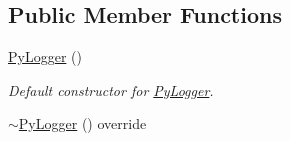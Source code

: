 \subsection*{Public Member Functions}
\begin{DoxyCompactItemize}
\item 
\hyperlink{class_py_logger_a83df7d583fb69bd21652009b74100ab8}{Py\+Logger} ()\hypertarget{class_py_logger_a83df7d583fb69bd21652009b74100ab8}{}\label{class_py_logger_a83df7d583fb69bd21652009b74100ab8}

\begin{DoxyCompactList}\small\item\em Default constructor for \hyperlink{class_py_logger}{Py\+Logger}. \end{DoxyCompactList}\item 
\hyperlink{class_py_logger_a442dd3cfcec84d57f9c5b7570efe0568}{$\sim$\+Py\+Logger} () override\hypertarget{class_py_logger_a442dd3cfcec84d57f9c5b7570efe0568}{}\label{class_py_logger_a442dd3cfcec84d57f9c5b7570efe0568}


\end{DoxyCompactItemize}

